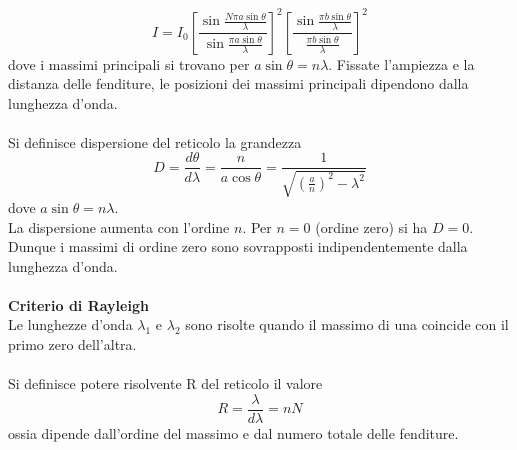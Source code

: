 \documentclass{article}
\begin{document}
\begin{equation}
    I=I_0\left[\frac{\sin\frac{N\pi a\sin\theta}{\lambda}}{\sin\frac{\pi a\sin\theta}{\lambda}}\right]^2 \left[\frac{\sin\frac{\pi b\sin\theta}{\lambda}}{\frac{\pi b\sin\theta}{\lambda}}\right]^2
    \nonumber
\end{equation}
dove i massimi principali si trovano per $a\sin\theta=n\lambda$.
Fissate l’ampiezza e la distanza delle fenditure, le posizioni dei massimi principali dipendono dalla lunghezza d’onda.\\
\\
Si definisce dispersione del reticolo la grandezza
\begin{equation}
    D=\frac{d\theta}{d\lambda}=\frac{n}{a\cos\theta}=\frac{1}{\sqrt{\left(\frac{a}{n}\right)^2-\lambda^2}}
    \nonumber
\end{equation}
dove $a\sin\theta=n\lambda$. \\
La dispersione aumenta con l’ordine $n$. Per $n=0$ (ordine zero) si ha $D=0$. Dunque i massimi di ordine zero sono sovrapposti indipendentemente dalla lunghezza d’onda.\\
\\
\textbf{Criterio di Rayleigh}\\
Le lunghezze d’onda $\lambda_1$ e $\lambda_2$ sono risolte quando il massimo di una coincide con il primo zero dell’altra.\\
\\
Si definisce potere risolvente R del reticolo il valore
\begin{equation}
    R=\frac{\lambda}{d\lambda}=nN
    \nonumber
\end{equation}
ossia dipende dall'ordine del massimo e dal numero totale delle fenditure.
\end{document}
